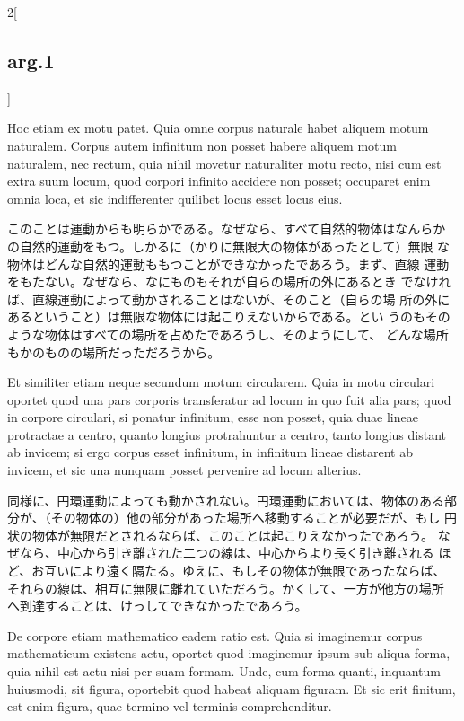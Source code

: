 \documentclass[paper=a4paper,fontsize=10pt,jafontsize=9pt,titlepage]{jlreq}
\begin{document}
\begin{paracol}{2}[\subsection{arg.1}]
\switchcolumn*

Hoc etiam ex motu patet. Quia omne corpus naturale habet aliquem motum
 naturalem. Corpus autem infinitum non posset habere aliquem motum
 naturalem, nec rectum, quia nihil movetur naturaliter motu recto, nisi
 cum est extra suum locum, quod corpori infinito accidere non posset;
 occuparet enim omnia loca, et sic indifferenter quilibet locus esset
 locus eius.

\switchcolumn

このことは運動からも明らかである。なぜなら、すべて自然的物体はなんらか
 の自然的運動をもつ。しかるに（かりに無限大の物体があったとして）無限
 な物体はどんな自然的運動ももつことができなかったであろう。まず、直線
 運動をもたない。なぜなら、なにものもそれが自らの場所の外にあるとき
 でなければ、直線運動によって動かされることはないが、そのこと（自らの場
 所の外にあるということ）は無限な物体には起こりえないからである。とい
 うのもそのような物体はすべての場所を占めたであろうし、そのようにして、
 どんな場所もかのものの場所だっただろうから。

\switchcolumn*

Et similiter etiam neque secundum motum circularem. Quia in motu
 circulari oportet quod una pars corporis transferatur ad locum in quo
 fuit alia pars; quod in corpore circulari, si ponatur infinitum, esse
 non posset, quia duae lineae protractae a centro, quanto longius
 protrahuntur a centro, tanto longius distant ab invicem; si ergo corpus
 esset infinitum, in infinitum lineae distarent ab invicem, et sic una
 nunquam posset pervenire ad locum alterius.

\switchcolumn

同様に、円環運動によっても動かされない。円環運動においては、物体のある部
 分が、（その物体の）他の部分があった場所へ移動することが必要だが、もし
 円状の物体が無限だとされるならば、このことは起こりえなかったであろう。
 なぜなら、中心から引き離された二つの線は、中心からより長く引き離される
 ほど、お互いにより遠く隔たる。ゆえに、もしその物体が無限であったならば、
 それらの線は、相互に無限に離れていただろう。かくして、一方が他方の場所
 へ到達することは、けっしてできなかったであろう。

\switchcolumn*

De corpore etiam mathematico eadem ratio est. Quia si imaginemur corpus
 mathematicum existens actu, oportet quod imaginemur ipsum sub aliqua
 forma, quia nihil est actu nisi per suam formam. Unde, cum forma
 quanti, inquantum huiusmodi, sit figura, oportebit quod habeat aliquam
 figuram. Et sic erit finitum, est enim figura, quae termino vel
 terminis comprehenditur.


\end{paracol}
\end{document}
